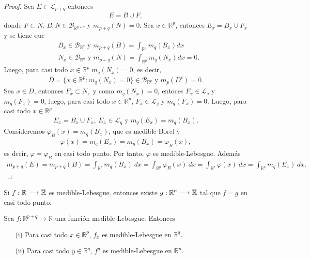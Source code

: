 \begin{proof}
    Sea $E \in \mathcal{L}_{p+q}$ entonces
    \begin{align*}
        E = B \cup F,
    \end{align*}
    donde $F \subset N$, $B, N \in \mathcal{B}_{\mathbb{R}^{p+q}}$ y $m_{p+q}(N) = 0$. Sea $x \in \mathbb{R}^p$, entonces $E_x = B_x \cup F_x$ y se tiene que
    \begin{align*}
         & B_x \in \mathcal{B}_{\mathbb{R}^{q}} \text{ y } m_{p+q}(B) = \int_{\mathbb{R}^p}{m_q(B_x) dx}      \\
         & N_x \in \mathcal{B}_{\mathbb{R}^{q}} \text{ y } m_{p+q}(N) = \int_{\mathbb{R}^p}{m_q(N_x) dx} = 0.
    \end{align*}
    Luego, para casi todo $x \in \mathbb{R}^p$ $m_q(N_x) = 0$, es decir,
    \begin{align*}
        D = \{ x \in \mathbb{R}^p : m_q(N_x) = 0 \} \in \mathcal{B}_{\mathbb{R}^{p}} \text{ y } m_p(D^c) = 0.
    \end{align*}
    Sea $x \in D$, entonces $F_x \subset N_x$ y como $m_q(N_x) = 0$, entoces $F_x \in \mathcal{L}_{q}$ y $m_q(F_x) = 0$, luego, para casi todo $x \in \mathbb{R}^p$, $F_x \in \mathcal{L}_{q}$ y $m_q(F_x) = 0$. Luego, para casi todo $x \in \mathbb{R}^p$
    \begin{align*}
        E_x = B_x \cup F_x, \ E_x \in \mathcal{L}_q \text{ y } m_q(E_x) = m_q(B_x).
    \end{align*}
    Consideremos $\varphi_B(x) = m_q(B_x)$, que es medible-Borel y
    \begin{align*}
        \varphi(x) = m_q(E_x) = m_q(B_x) = \varphi_B(x),
    \end{align*}
    es decir, $\varphi = \varphi_B$ en casi todo punto. Por tanto, $\varphi$ es medible-Lebesgue. Además
    \begin{align*}
        m_{p+q}(E) = m_{p+q}(B) = \int_{\mathbb{R}^p}{m_q(B_x) \ dx} = \int_{\mathbb{R}^p}{\varphi_B(x) \ dx} =  \int_{\mathbb{R}^p}{\varphi(x) \ dx} = \int_{\mathbb{R}^p}{m_q(E_x) \ dx}.
    \end{align*}
\end{proof}

\begin{lema}
    Si $f: \mathbb{R} \longrightarrow \overline{\mathbb{R}}$ es medible-Lebesgue, entonces existe $g: \mathbb{R}^n \longrightarrow \overline{\mathbb{R}}$ tal que $f = g$ en casi todo punto.
\end{lema}

\begin{prop}
    Sea $f: \mathbb{R}^{p+q} \longrightarrow \mathbb{R}$ una función medible-Lebesgue. Entonces
    \begin{enumerate}
        \item[(i)] Para casi todo $x \in \mathbb{R}^p$, $f_x$ es medible-Lebesgue en $\mathbb{R}^q$.
        \item[(ii)] Para casi todo $y \in \mathbb{R}^q$, $f^y$ es medible-Lebesgue en $\mathbb{R}^p$.
    \end{enumerate}
\end{prop}

